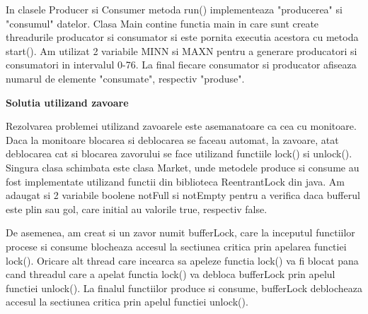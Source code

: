 \documentclass{article}
\begin{document}
\hspace{0.5 cm}
In clasele Producer si Consumer metoda run() implementeaza "producerea" si "consumul" datelor. Clasa Main contine functia main in care sunt create threadurile producator si consumator si este pornita executia acestora cu metoda start(). Am utilizat 2 variabile MINN si MAXN pentru a generare producatori si consumatori in intervalul 0-76. La final fiecare consumator si producator afiseaza numarul de elemente "consumate", respectiv "produse".

\vspace{5mm}
{\large \textbf {Solutia utilizand zavoare}}

\hspace{0.5 cm}
Rezolvarea problemei utilizand zavoarele este asemanatoare ca cea cu monitoare. Daca la monitoare blocarea si deblocarea se faceau automat, la zavoare, atat deblocarea cat si blocarea zavorului se face utilizand functiile lock() si unlock(). Singura clasa schimbata este clasa Market, unde metodele produce si consume au fost implementate utilizand functii din biblioteca ReentrantLock din java. Am adaugat si 2 variabile boolene notFull si notEmpty pentru a verifica daca bufferul este plin sau gol, care initial au valorile true, respectiv false. 

\hspace{0.5 cm}
De asemenea, am creat si un zavor numit bufferLock, care la inceputul functiilor procese si consume blocheaza accesul la sectiunea critica prin apelarea functiei lock(). Oricare alt thread care incearca sa apeleze functia lock() va fi blocat pana cand threadul care a apelat functia lock() va debloca bufferLock prin apelul functiei unlock(). La finalul functiilor produce si consume, bufferLock deblocheaza accesul la sectiunea critica prin apelul functiei unlock().

\end{document}
